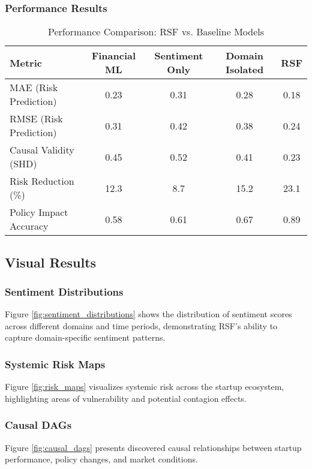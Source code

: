 \subsubsection{Performance Results}

\begin{table}[H]
\centering
\caption{Performance Comparison: RSF vs. Baseline Models}
\label{tab:performance_comparison}
\begin{tabular}{@{}lcccc@{}}
\toprule
\textbf{Metric} & \textbf{Financial ML} & \textbf{Sentiment Only} & \textbf{Domain Isolated} & \textbf{RSF} \\
\midrule
MAE (Risk Prediction) & 0.23 & 0.31 & 0.28 & 0.18 \\
RMSE (Risk Prediction) & 0.31 & 0.42 & 0.38 & 0.24 \\
Causal Validity (SHD) & 0.45 & 0.52 & 0.41 & 0.23 \\
Risk Reduction (\%) & 12.3 & 8.7 & 15.2 & 23.1 \\
Policy Impact Accuracy & 0.58 & 0.61 & 0.67 & 0.89 \\
\bottomrule
\end{tabular}
\end{table}

\subsection{Visual Results}

\subsubsection{Sentiment Distributions}
Figure \ref{fig:sentiment_distributions} shows the distribution of sentiment scores across different domains and time periods, demonstrating RSF's ability to capture domain-specific sentiment patterns.

\subsubsection{Systemic Risk Maps}
Figure \ref{fig:risk_maps} visualizes systemic risk across the startup ecosystem, highlighting areas of vulnerability and potential contagion effects.

\subsubsection{Causal DAGs}
Figure \ref{fig:causal_dags} presents discovered causal relationships between startup performance, policy changes, and market conditions.

